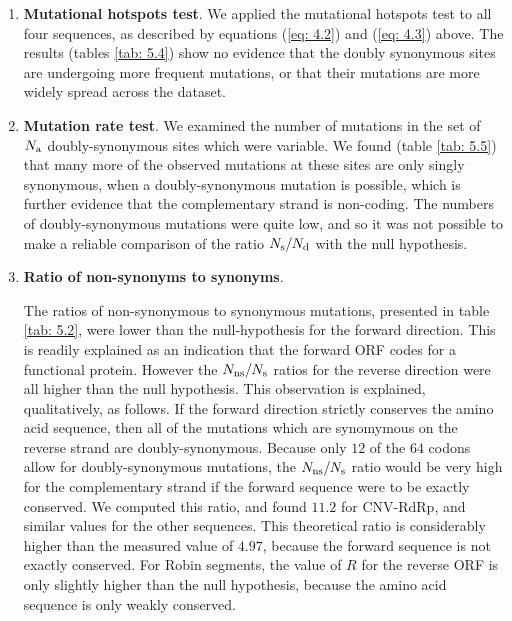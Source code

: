 \documentclass[unnumsec,webpdf,contemporary,large,namedate]{oup-authoring-template}%
\theoremstyle{thmstyleone}%
\theoremstyle{thmstyletwo}%
\theoremstyle{thmstylethree}%
\begin{document}
\begin{enumerate}

\item{\bf Mutational hotspots test}. We applied the mutational hotspots test to all four sequences,
as described by equations (\ref{eq: 4.2}) and (\ref{eq: 4.3}) above.
The results (tables \ref{tab: 5.4}) show no evidence that the doubly synonymous sites are
undergoing more frequent mutations, or that their mutations are more widely spread across the dataset.

\item{\bf Mutation rate test}. We examined the number of mutations in the set
of $N_{\rm a}$ doubly-synonymous sites which were variable. We found (table \ref{tab: 5.5})
that many more of the observed mutations at these sites are only singly synonymous, when
a doubly-synonymous mutation is possible, which is further evidence that the complementary
strand is non-coding. The numbers of doubly-synonymous mutations
were quite low, and so it was not possible to make a reliable comparison of the
ratio $N_{\rm s}/N_{\rm d}$ with the null hypothesis.

\item{\bf Ratio of non-synonyms to synonyms}.

The ratios of non-synonymous to synonymous mutations, presented in table \ref{tab: 5.2}, were
lower than the null-hypothesis for the forward direction. This is readily explained as an indication
that the forward ORF codes for a functional protein. However the $N_{\rm ns}/N_{\rm s}$
ratios for the reverse direction were all higher than the null hypothesis. This observation
is explained, qualitatively, as follows.
If the forward direction strictly conserves the amino acid sequence, then all of the mutations
which are synomymous on the reverse strand are doubly-synonymous. Because only
$12$ of the $64$ codons allow for doubly-synonymous mutations, the $N_{\rm ns}/N_{\rm s}$
ratio would be very high for the complementary strand if the forward sequence were to be exactly conserved.
We computed this ratio, and found $11.2$ for CNV-RdRp, and similar values for the other sequences.
This theoretical ratio is considerably higher than the measured value of $4.97$, because the
forward sequence is not exactly conserved. For Robin segments, the value of $R$ for the reverse
ORF is only slightly higher than the null hypothesis, because the amino acid sequence is only weakly
conserved.

\end{enumerate}
\end{document}
